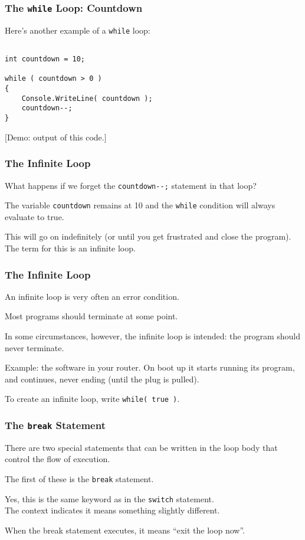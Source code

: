 \begin{frame}[fragile]
\frametitle{The \texttt{while} Loop: Countdown}

Here's another example of a \texttt{while} loop:

\begin{verbatim}

int countdown = 10;

while ( countdown > 0 ) 
{
    Console.WriteLine( countdown );
    countdown--;
}

\end{verbatim}

[Demo: output of this code.]

\end{frame}

\begin{frame}
\frametitle{The Infinite Loop}

What happens if we forget the \texttt{countdown{-}{-};} statement in that loop?

The variable \texttt{countdown} remains at 10 and the \texttt{while} condition will always evaluate to true.

This will go on indefinitely (or until you get frustrated and close the program). The term for this is an \alert{infinite loop}.

\end{frame}

\begin{frame}
\frametitle{The Infinite Loop}

An infinite loop is very often an error condition.

Most programs should terminate at some point.

In some circumstances, however, the infinite loop is intended: the program should never terminate.

Example: the software in your router. On boot up it starts running its program, and continues, never ending (until the plug is pulled).

To create an infinite loop, write \texttt{while( true )}.

\end{frame}

\begin{frame}
\frametitle{The \texttt{break} Statement}

There are two special statements that can be written in the loop body that control the flow of execution.

The first of these is the \texttt{break} statement.

Yes, this is the same keyword as in the \texttt{switch} statement.\\
\quad The context indicates it means something slightly different.

When the break statement executes, it means ``exit the loop now''.

\end{frame}


